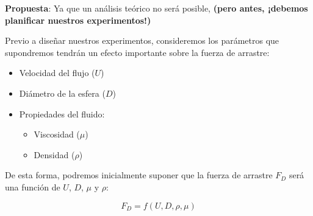 \documentclass[t]{beamer}
\begin{document}
\begin{frame}
\textbf{Propuesta}: Ya que un análisis teórico no será posible, {\color{red}{investiguemos experimentalmente el flujo alrededor de la esfera}} \textbf{(pero antes, ¡debemos planificar nuestros experimentos!)}
\vspace{0.5cm}

Previo a diseñar nuestros experimentos, consideremos los parámetros que supondremos tendrán un efecto importante sobre la fuerza de arrastre:

\begin{itemize}
\item Velocidad del flujo ($U$)
\item Diámetro de la esfera ($D$)
\item Propiedades del fluido:
\begin{itemize}
\item Viscosidad ($\mu$)
\item Densidad ($\rho$)
\end{itemize}
\end{itemize}

De esta forma, podremos inicialmente suponer que la fuerza de arrastre $F_D$ será una función de $U$, $D$, $\mu$ y $\rho$:

$$F_D = f\left(U, D, \rho, \mu\right)$$

\end{frame}
\end{document}
